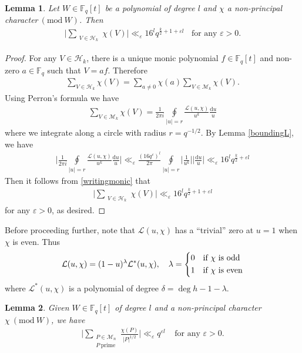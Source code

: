 \documentclass[12pt,reqno]{amsart}
\newcommand{\Mod}[1]{\ (\mathrm{mod}\ #1)}
\newcommand{\BF}{\mathbb{F}}
\newcommand{\CL}{\mathcal{L}}
\newcommand{\CM}{\mathcal{M}}
\newcommand{\CH}{\mathcal{H}}
\newtheorem{lem}{Lemma}[subsection]
\begin{document}
\begin{lem}\label{sumofchi}%
    Let $W \in \BF_q[t]$ be a polynomial of degree $l$ and $\chi$ a non-principal character$\Mod W$.  Then
    \begin{align*}
        \Big | \sum_{\substack{ V \in  \CH_{k} }} \chi(V) \Big | \ll_{\varepsilon} 16^l q^{\frac{k}{2} + 1  + \varepsilon l} \ \ \ \ \text{for any $\varepsilon > 0 $}.
    \end{align*}
\end{lem}
\begin{proof}
    For any $V \in \CH_k$, there is a unique monic polynomial $f\in \BF_q[t]$ and non-zero $a \in \BF_q$ such that $V=af$. Therefore 
    \begin{align}\label{writingmonic}
    \sum_{V \in \CH_k} \chi(V) = \sum_{a \neq 0} \chi(a) \sum_{V \in \CM_k} \chi(V).
    \end{align}    
    Using Perron's formula we have
    \begin{align*}
        \sum\limits_{ V \in \CM_{k}} \chi(V) = \frac{1}{2\pi i} \oint\limits_{|u|=r} \frac{\CL(u,\chi)}{u^k} \frac{\mathrm{d}u}{u} 
    \end{align*}
where we integrate along a circle with radius $r=q^{-1/2}$. By Lemma \ref{boundingL}, we have
\begin{align*}
    \Big | \frac{1}{2\pi i} \oint\limits_{|u|=r} \frac{\CL(u,\chi)}{u^k} \frac{\mathrm{d}u}{u} \Big| \ll_{\varepsilon} \frac{(16 q^{\varepsilon})^{l}}{2\pi} \oint\limits_{|u|=r} \Big | \frac{1}{u^k} \Big | \Big |\frac{\mathrm{d}u}{u} \Big | \ll_{\varepsilon} 16^{l} q^{\frac{k}{2} + \varepsilon l }
\end{align*}
Then it follows from \eqref{writingmonic} that
\begin{align*}
\Big | \sum_{\substack{ V \in  \CH_{k} }} \chi(V) \Big | \ll_{\varepsilon} 16^{l} q^{\frac{k}{2}+1 + \varepsilon l}
\end{align*}
for any $\varepsilon > 0$, as desired. 
\end{proof}


Before proceeding further, note that
$\CL(u, \chi)$ has a ``trivial'' zero at $u=1$ when $\chi$ is even. Thus
\[ \CL(u,\chi)= (1-u)^{\lambda}\CL^{*}(u,\chi), \ \ \ \lambda=
    \begin{dcases}
        0 & \text{if}\ \chi \ \text{is odd} \\
        1 & \text{if}\ \chi \ \text{is even} \\
    \end{dcases}
\]
where $\CL^{*}(u,\chi)$  is a polynomial of degree 
$\delta = \deg h - 1 - \lambda$. 
\begin{lem}\label{sumofchioverprimes}
    Given $W \in \BF_{q}[t]$ of degree $l$ and a non-principal character $\chi \Mod{W}$, we have
    \begin{align*}
        \Big | \sum_{\substack{P \in \CM_{n} \\ P \ \text{prime} }} \frac{\chi(P) }{|P|^{1/2}} \Big |  \ll_{\varepsilon} q^{\varepsilon l} \ \ \ \ \ \text{for any $\varepsilon > 0$}.
    \end{align*}
\end{lem}
\end{document}
